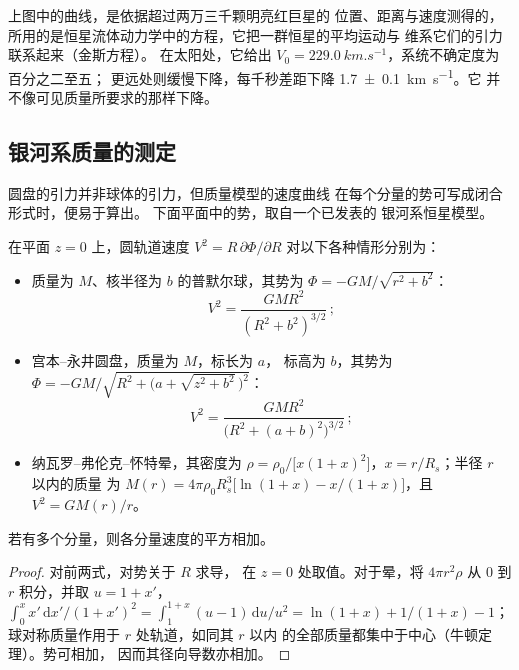 上图中的曲线，是依据超过两万三千颗明亮红巨星的
位置、距离与速度测得的，
所用的是恒星流体动力学中的方程，它把一群恒星的平均运动与
维系它们的引力联系起来（金斯方程）。
在太阳处，它给出 $V_0 = \qty{229.0}{km.s^{-1}}$，系统不确定度为百分之二至五；
更远处则缓慢下降，每千秒差距下降
\qty[separate-uncertainty=true]{1.7 \pm 0.1}{km.s^{-1}}。它
并不像可见质量所要求的那样下降。

\subsection*{银河系质量的测定}

圆盘的引力并非球体的引力，但质量模型的速度曲线
在每个分量的势可写成闭合形式时，便易于算出。
下面平面中的势，取自一个已发表的
银河系恒星模型。

\begin{proposition}[三种质量模型的圆轨道速度]\label{prop:b3:milky-way-galaxies:models}
在平面 $z = 0$ 上，圆轨道速度 $V^2 = R\,\partial\Phi/\partial R$
对以下各种情形分别为：
\begin{itemize}
\item 质量为 $M$、核半径为 $b$ 的普默尔球，其势为
  $\Phi = -GM/\sqrt{r^2 + b^2}$：
  \[ V^2 = \frac{GMR^2}{(R^2 + b^2)^{3/2}}\,; \]
\item 宫本–永井圆盘，质量为 $M$，标长为 $a$，
  标高为 $b$，其势为
  $\Phi = -GM\big/\sqrt{R^2 + \bigl(a + \sqrt{z^2 + b^2}\,\bigr)^2}$：
  \[ V^2 = \frac{GMR^2}{\bigl(R^2 + (a + b)^2\bigr)^{3/2}}\,; \]
\item 纳瓦罗–弗伦克–怀特晕，其密度为
  $\rho = \rho_0\big/\bigl[x(1 + x)^2\bigr]$，$x = r/R_s$；半径 $r$ 以内的质量
  为 $M(r) = 4\pi\rho_0R_s^3\bigl[\ln(1 + x) - x/(1 + x)\bigr]$，且
  $V^2 = GM(r)/r$。
\end{itemize}
若有多个分量，则各分量速度的平方相加。
\end{proposition}

\begin{proof}
对前两式，对势关于 $R$ 求导，
在 $z = 0$ 处取值。对于晕，将 $4\pi r^2\rho$ 从 0 到 $r$ 积分，并取
$u = 1 + x'$，$\int_0^x x'\,\mathrm{d}x'/(1 + x')^2 =
\int_1^{1+x}(u - 1)\,\mathrm{d}u/u^2 = \ln(1 + x) + 1/(1 + x) - 1$；
球对称质量作用于 $r$ 处轨道，如同其 $r$ 以内
的全部质量都集中于中心（牛顿定理）。势可相加，
因而其径向导数亦相加。
\end{proof}

